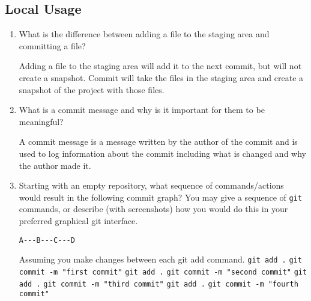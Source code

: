 \documentclass[10pt,twocolumn]{article}
\begin{document}
\subsection{Local Usage}

\begin{enumerate}
\item What is the difference between adding a file to the staging area and committing a file?\newline
\par Adding a file to the staging area will add it to the next commit, but will not create a snapshot. Commit will take the files in the staging area and create a snapshot of the project with those files.\newline
\item What is a commit message and why is it important for them to be meaningful?\newline
\par A commit message is a message written by the author of the commit and is used to log information about the commit including what is changed and why the author made it. \newline
\item Starting with an empty repository, what sequence of commands/actions would result in the following commit graph? You may give a sequence of \texttt{git} commands, or describe (with screenshots) how you would do this in your preferred graphical git interface.
\begin{verbatim}
A---B---C---D
\end{verbatim}
\par Assuming you make changes between each git add command.
\newline
\texttt{git add .}
\newline
\texttt{git commit -m "first commit"}
\newline
\texttt{git add .}
\newline
\texttt{git commit -m "second commit"}
\newline
\texttt{git add .}
\newline
\texttt{git commit -m "third commit"}
\newline
\texttt{git add .}
\newline
\texttt{git commit -m "fourth commit"}
\newline


\end{enumerate}
\end{document}
